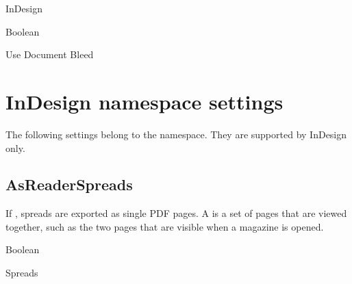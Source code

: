 \documentclass[letterpaper,12pt,english,openany,oneside]{sphinxmanual}
\begin{document}
\label{\detokenize{PDF_Create_NewNamespaces:supported-by-26}}

InDesign

\label{\detokenize{PDF_Create_NewNamespaces:type-26}}

Boolean

\label{\detokenize{PDF_Create_NewNamespaces:ui-name-26}}

Use Document Bleed

\label{\detokenize{PDF_Create_NewNamespaces:default-value-25}}

\begin{sphinxVerbatim}[commandchars=\\\{\}]
\end{sphinxVerbatim}




\section{InDesign namespace settings}
\label{\detokenize{PDF_Create_NewNamespaces:indesign-namespace-settings}}
The following settings belong to the  namespace. They are supported by InDesign only.


\subsection{AsReaderSpreads}
\label{\detokenize{PDF_Create_NewNamespaces:asreaderspreads}}
If  , spreads are exported as single PDF pages. A  is a set of pages that are viewed together, such as the two pages that are visible when a magazine is opened.

\label{\detokenize{PDF_Create_NewNamespaces:type-27}}

Boolean

\label{\detokenize{PDF_Create_NewNamespaces:ui-name-27}}

Spreads

\label{\detokenize{PDF_Create_NewNamespaces:default-value-26}}

\begin{sphinxVerbatim}[commandchars=\\\{\}]
\end{sphinxVerbatim}
\end{document}
